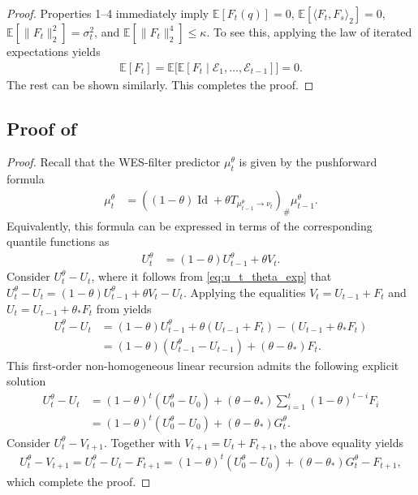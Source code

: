 \documentclass[a4paper, 11pt]{article}
\newcommand{\E}{\mathbb E}
\newcommand{\T}{\mathcal E}
\theoremstyle{definition}
\begin{document}
\begin{proof}
	Properties 1--4 immediately imply $\E[ F_{t}(q) ] = 0$, $\E[ \langle F_{t}, F_{s} \rangle_2 ] = 0$, $\E[ \| F_{t} \|_2^2 ] = \sigma_{t}^2$, and $\E[ \| F_{t} \|_2^4 ] \le \kappa$.
    To see this, applying the law of iterated expectations yields
    \begin{align}
        \E[ F_{t} ] = \E\big[\E[ F_{t} \mid \T_1, \dots, \T_{t-1}]\big] = 0 .
    \end{align}
    The rest can be shown similarly. 
    This completes the proof.
\end{proof}



\subsection{Proof of } \label{apx:proof_model_quantile_decomposition}

\begin{proof}
	Recall that the WES-filter predictor $\mu_t^\theta$ is given by the pushforward formula
    \begin{align}
		\mu_{t}^{\theta} & = \left( (1 - \theta) \operatorname{Id} + \theta  T_{\mu_{t-1}^{\theta} \to {\nu}_{t}} \right)_{\#} \mu_{t-1}^{\theta} .
	\end{align}
    Equivalently, this formula can be expressed in terms of the corresponding quantile functions as
	\begin{align}
		U_t^\theta & = (1 - \theta) U_{t-1}^\theta + \theta V_{t} . \label{eq:u_t_theta_exp}
	\end{align}
    Consider $U_t^\theta - U_t$, where it follows from \eqref{eq:u_t_theta_exp} that $U_t^\theta - U_t = (1 - \theta) U_{t-1}^\theta + \theta V_{t} - U_{t}$.
    Applying the equalities $V_t = U_{t-1} + F_{t}$ and $U_t = U_{t-1} + \theta_* F_{t}$ from  yields
	\begin{align}
		U_t^\theta - U_t & = (1 - \theta) U_{t-1}^\theta + \theta ( U_{t-1} + F_{t} ) - ( U_{t-1} + \theta_* F_{t} ) \\
		& = (1 - \theta) ( U_{t-1}^\theta -  U_{t-1} ) + (\theta - \theta_*) F_{t}.
	\end{align}
    This first-order non-homogeneous linear recursion admits the following explicit solution
	\begin{align}
		U_t^\theta - U_t & = (1 - \theta)^t ( U_0^\theta - U_0 ) + ( \theta - \theta_* ) \sum_{i=1}^{t} (1 - \theta)^{t-i} F_i \\ 
        &= (1 - \theta)^t ( U_0^\theta - U_0 ) + ( \theta - \theta_* ) G_t^\theta .
	\end{align}
    Consider $U_{t}^\theta - V_{t+1}$.
    Together with $V_{t+1} = U_{t} + F_{t+1}$, the above equality yields
	\begin{align}
		U_{t}^\theta - V_{t+1} = U_{t}^\theta - U_{t} - F_{t+1} = (1 - \theta)^{t} ( U_0^\theta - U_0 ) + ( \theta - \theta_* ) G_{t}^\theta - F_{t+1} ,
    \end{align}
    which complete the proof.
\end{proof}
\end{document}
